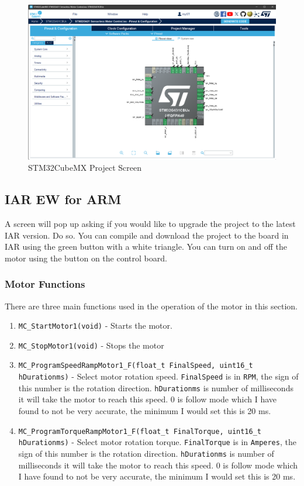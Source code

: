 \documentclass[10pt]{article}
\begin{document}
            \begin{figure}[H]
                \centerline{\includegraphics[width=\textwidth]{References/CubeMX.png}}
                \caption{STM32CubeMX Project Screen}
                    \end{figure}
		\FloatBarrier \subsection{IAR EW for ARM}
                    A screen will pop up asking if you would like to upgrade the project to the latest IAR version. Do so. You can compile and download the project to the board in IAR using the green button with a white triangle. You can turn on and off the motor using the button on the control board.
			\FloatBarrier \subsubsection{Motor Functions}
                        There are three main functions used in the operation of the motor in this section.
                        \begin{enumerate}
                            \item \texttt{MC\_StartMotor1(void)} - Starts the motor.
                            \item \texttt{MC\_StopMotor1(void)} - Stops the motor
                            \item \texttt{MC\_ProgramSpeedRampMotor1\_F(float\_t FinalSpeed, uint16\_t hDurationms)} - Select motor rotation speed. \texttt{FinalSpeed} is in \texttt{RPM}, the sign of this number is the rotation direction. \texttt{hDurationms} is number of milliseconds it will take the motor to reach this speed. 0 is follow mode which I have found to not be very accurate, the minimum I would set this is 20 ms.
                            \item \texttt{MC\_ProgramTorqueRampMotor1\_F(float\_t FinalTorque, uint16\_t hDurationms)} - Select motor rotation torque. \texttt{FinalTorque} is in \texttt{Amperes}, the sign of this number is the rotation direction. \texttt{hDurationms} is number of milliseconds it will take the motor to reach this speed. 0 is follow mode which I have found to not be very accurate, the minimum I would set this is 20 ms.
                        \end{enumerate}
\end{document}
